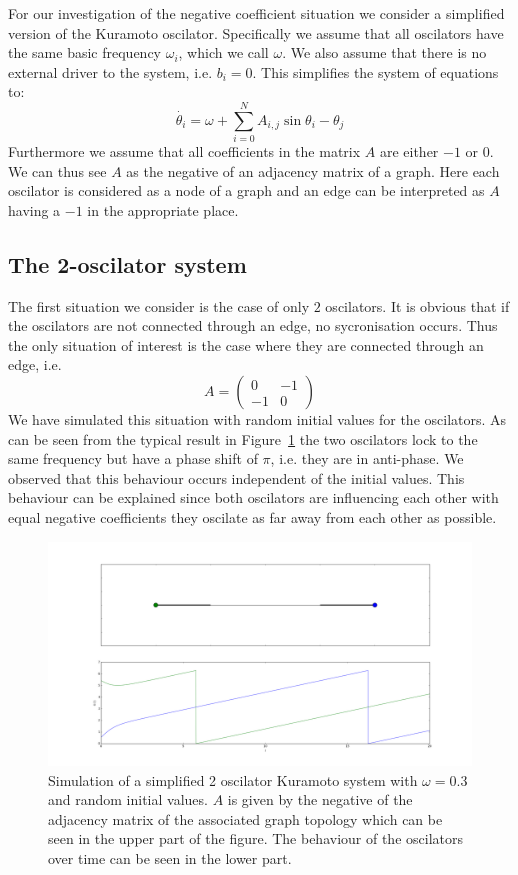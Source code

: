 \label{sec:negative}
For our investigation of the negative coefficient situation we consider a simplified version of the Kuramoto oscilator. Specifically we assume that all oscilators have the same basic frequency $\omega_i$, which we call $\omega$. We also assume that there is no external driver to the system, i.e. $b_i = 0$. This simplifies the system of equations to: 
\[
  \dot{\theta_i} = \omega + \sum_{i = 0}^{N}{A_{i, j}\sin{\theta_i - \theta_j}}
\]
Furthermore we assume that all coefficients in the matrix $A$ are either $-1$ or $0$. We can thus see $A$ as the negative of an adjacency matrix of a graph. Here each oscilator is considered as a node of a graph and an edge can be interpreted as $A$ having a $-1$ in the appropriate place. 

\subsection{The 2-oscilator system}

The first situation we consider is the case of only $2$ oscilators. It is obvious that if the oscilators are not connected through an edge, no sycronisation occurs. Thus the only situation of interest is the case where they are connected through an edge, i.e. 
\[
  A = \left( \begin{array}{cc} 0 & -1\\ -1 & 0 \end{array} \right)
\]
We have simulated this situation with random initial values for the oscilators. As can be seen from the typical result in Figure~\ref{fig:negative_2_osc} the two oscilators lock to the same frequency but have a phase shift of $\pi$, i.e. they are in anti-phase. We observed that this behaviour occurs independent of the initial values. This behaviour can be explained since both oscilators are influencing each other with equal negative coefficients they oscilate as far away from each other as possible. 

\begin{figure}[h]
  \centering
  \includegraphics[width=\textwidth]{imgs/simple_2_osc}
  \caption{Simulation of a simplified 2 oscilator Kuramoto system with $\omega = 0.3$ and random initial values. $A$ is given by the negative of the adjacency matrix of the associated graph topology which can be seen in the upper part of the figure. The behaviour of the oscilators over time can be seen in the lower part. }
  \label{fig:negative_2_osc}
\end{figure}

